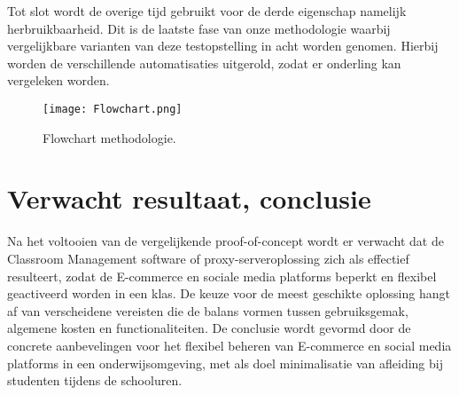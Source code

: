 Tot slot wordt de overige tijd gebruikt voor de derde eigenschap namelijk herbruikbaarheid. Dit is de laatste fase van onze methodologie waarbij vergelijkbare varianten van deze testopstelling in acht worden genomen. Hierbij worden de verschillende automatisaties uitgerold, zodat er onderling kan vergeleken worden. \newline

\begin{figure}[h]
    \centering
    \texttt{[image: Flowchart.png]}
    \caption{Flowchart methodologie.}
    \label{fig:Flowchart}
\end{figure}


\section{Verwacht resultaat, conclusie}%
\label{sec:verwachte_resultaten}

Na het voltooien van de vergelijkende proof-of-concept wordt er verwacht dat de Classroom Management software of proxy-serveroplossing zich als effectief resulteert, zodat de E-commerce en sociale media platforms beperkt en flexibel geactiveerd worden in een klas. De keuze voor de meest geschikte oplossing hangt af van verscheidene vereisten die de balans vormen tussen gebruiksgemak, algemene kosten en functionaliteiten. De conclusie wordt gevormd door de concrete aanbevelingen voor het flexibel beheren van E-commerce en social media platforms in een onderwijsomgeving, met als doel minimalisatie van afleiding bij studenten tijdens de schooluren.